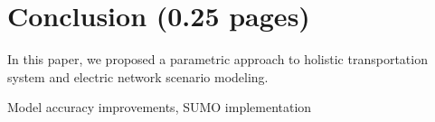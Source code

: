 \section{Conclusion (0.25 pages)}
\label{section:conclusion}

In this paper, we proposed a parametric approach to holistic transportation system and electric network scenario modeling.

Model accuracy improvements, SUMO implementation

